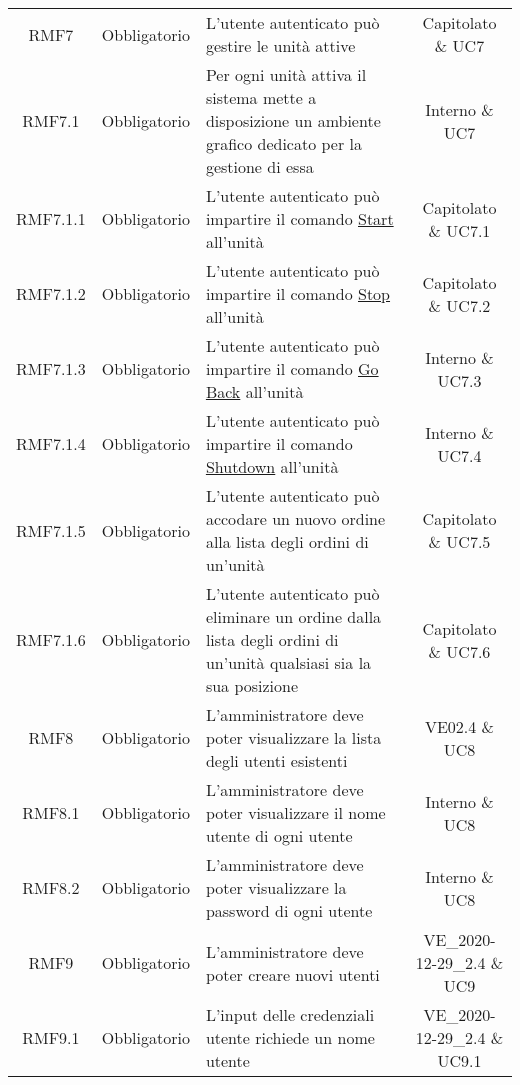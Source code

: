 \begin{longtable}[h!] { c c m{8cm} c}
		RMF7 & Obbligatorio & L'utente autenticato può gestire le unità attive & Capitolato \& UC7 \\

		RMF7.1 & Obbligatorio & Per ogni unità attiva il sistema mette a disposizione un ambiente grafico dedicato per la gestione di essa & Interno \& UC7 \\

		RMF7.1.1 & Obbligatorio & L'utente autenticato può impartire il comando \underline{Start} all'unità & Capitolato \& UC7.1 \\

		RMF7.1.2 & Obbligatorio & L'utente autenticato può impartire il comando \underline{Stop} all'unità & Capitolato \& UC7.2 \\

		RMF7.1.3 & Obbligatorio & L'utente autenticato può impartire il comando \underline{Go Back} all'unità & Interno \& UC7.3 \\

		RMF7.1.4 & Obbligatorio & L'utente autenticato può impartire il comando \underline{Shutdown} all'unità & Interno \& UC7.4 \\

		RMF7.1.5 & Obbligatorio & L'utente autenticato può accodare un nuovo ordine alla lista degli ordini di un'unità & Capitolato \& UC7.5 \\

		RMF7.1.6 & Obbligatorio & L'utente autenticato può eliminare un ordine dalla lista degli ordini di un'unità qualsiasi sia la sua posizione & Capitolato \& UC7.6 \\

		RMF8 & Obbligatorio & L'amministratore deve poter visualizzare la lista degli utenti esistenti & VE02.4 \& UC8 \\

		RMF8.1 & Obbligatorio & L'amministratore deve poter visualizzare il nome utente di ogni utente & Interno \& UC8 \\

		RMF8.2 & Obbligatorio & L'amministratore deve poter visualizzare la password di ogni utente & Interno \& UC8 \\

		RMF9 & Obbligatorio & L'amministratore deve poter creare nuovi utenti & VE_2020-12-29_2.4 \& UC9 \\

		RMF9.1 & Obbligatorio & L'input delle credenziali utente richiede un nome utente & VE_2020-12-29_2.4 \& UC9.1 \\


\end{longtable}
